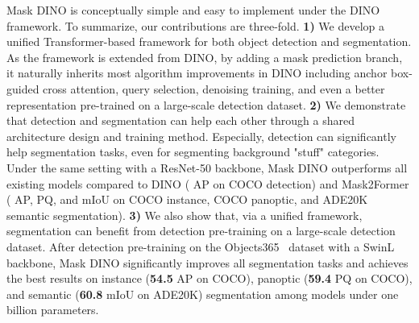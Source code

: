 \documentclass[10pt,twocolumn,letterpaper]{article}
\begin{document}
Mask DINO is conceptually simple and easy to implement under the DINO framework. 
To summarize, our contributions are three-fold.
    \textbf{1)} We develop a unified Transformer-based framework for both object detection and segmentation. As the framework is extended from DINO, by adding a mask prediction branch, it naturally inherits most algorithm improvements in DINO including anchor box-guided cross attention, query selection, denoising training, and even a better representation pre-trained on a large-scale detection dataset.
    \textbf{2)} We demonstrate that detection and segmentation can help each other through a shared architecture design and training method. Especially, detection can significantly help segmentation tasks, even for segmenting background "stuff" categories.
    Under the same setting with a ResNet-50 backbone, Mask DINO outperforms all existing models compared to DINO ( AP on COCO detection) and Mask2Former ( AP,  PQ, and  mIoU on COCO instance, COCO panoptic, and ADE20K semantic segmentation).
    \textbf{3)} We also show that, via a unified framework, segmentation can benefit from detection pre-training on a large-scale detection dataset. After detection pre-training on the Objects365~\cite{shao2019objects365} dataset with a SwinL~\cite{liu2021swin} backbone, Mask DINO significantly improves all segmentation tasks and achieves the best results on instance (\textbf{54.5} AP on COCO),  panoptic (\textbf{59.4} PQ on COCO), and semantic (\textbf{60.8} mIoU on ADE20K) segmentation among models under one billion parameters. 
\end{document}
